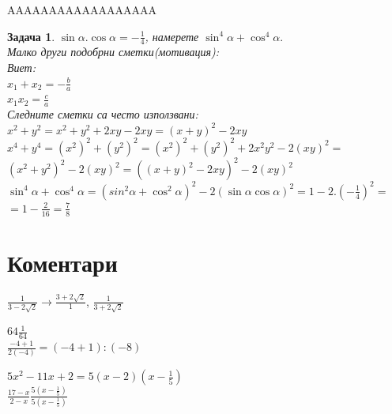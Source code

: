 \documentclass{article}
\newtheorem{problem}{Задача}
\begin{document}
AAAAAAAAAAAAAAAAAA \\

\begin{problem}
	$\sin \alpha . \cos \alpha = -\frac{1}{4}  $, намерете $\sin^4 \alpha + \cos^4 \alpha. $\\
	Малко други подобрни сметки(мотивация): \\
	Виет: \\
	$x_1 + x_2 = - \frac{b}{a} $\\
	$x_1 x_2 = \frac{c}{a} $\\
	Следните сметки са често използвани: \\
	$x^2 + y^2 = x^2 + y^2 +2xy - 2xy =  (x+y)^2 - 2xy $\\
	$x^4 + y^4 = (x^2)^2 +( y^2)^2 = (x^2)^2 +( y^2)^2 + 2x^2y^2 - 2(xy)^2 = $ \\
	$ (x^2 + y^2)^2 - 2(xy)^2  = ((x+y)^2 - 2xy)^2 - 2(xy)^2$ \\
	
	$\sin^4 \alpha + \cos^4 \alpha = (sin^2 \alpha + \cos^2 \alpha)^2 - 2(\sin \alpha \cos \alpha)^2 = 1 - 2.(-\frac{1}{4})^2 = $\\
	$= 1 - \frac{2}{16} = \frac{7}{8} $
	
\end{problem}

\section{Коментари}


$\frac{1}{3-2\sqrt2 } \to \frac{3+2\sqrt 2}{1} $, 
$\frac{1}{3+2\sqrt2 } $
\vspace{1cm}

$64\frac{1}{64} $\\
$\frac{-4+1}{2(-4)} = (-4+1):(-8) $


\vspace{1cm}

$5x^2 - 11x + 2 = 5(x-2)(x-\frac{1}{5}) $ \\

$ \frac{17-x}{2-x}\frac{5(x-\frac{1}{5})}{5(x-\frac{1}{5})} $
\end{document}

